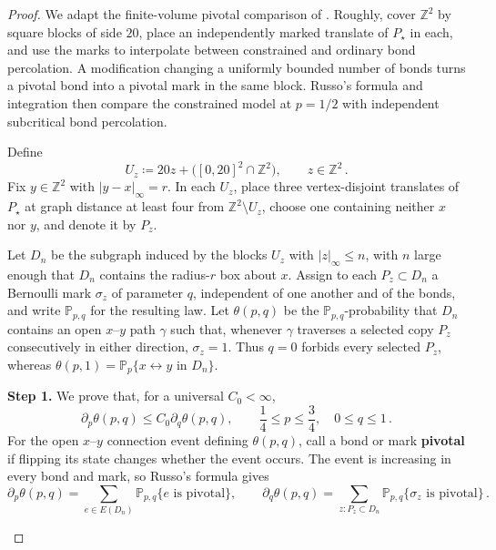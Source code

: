 \documentclass[11pt]{amsart}
\theoremstyle{plain}
\theoremstyle{definition}
\newcommand{\Z}{\mathbb Z}
\renewcommand{\P}{\mathbb P}
\newcommand{\defn}[1]{\textbf{#1}}
\begin{document}
	\begin{proof}
		We adapt the finite-volume pivotal comparison of
		\citet[Section~6, especially Theorem~6.1 and
		Proposition~6.3]{CoupierHenryJahnelKoppl2024}.  Roughly, cover $\Z^2$ by square
		blocks of side $20$, place an independently marked translate of $P_\star$ in
		each, and use the marks to interpolate between constrained and ordinary bond
		percolation.  A modification changing a uniformly bounded number of bonds turns
		a pivotal bond into a pivotal mark in the same block.  Russo's formula and
		integration then compare the constrained model at $p=1/2$ with independent subcritical
		bond percolation.

		Define
		\[
		U_z\coloneqq20z+\bigl([0,20]^2\cap\Z^2\bigr),
		\qquad z\in\Z^2\, .
		\]
		Fix $y\in\Z^2$ with $|y-x|_\infty=r$.  In
		each $U_z$, place three vertex-disjoint translates of $P_\star$ at graph distance at least four from
		$\Z^2\setminus U_z$, choose one containing neither $x$ nor $y$, and denote
		it by $P_z$.
		
		Let $D_n$ be the subgraph induced by the blocks $U_z$ with $|z|_\infty\leq n$,
		with $n$ large enough that $D_n$ contains the radius-$r$ box about $x$.  Assign to
		each $P_z\subset D_n$ a Bernoulli mark $\sigma_z$ of parameter $q$,
		independent of one another and of the bonds, and write $\P_{p,q}$ for the
		resulting law.  Let $\theta(p,q)$ be the $\P_{p,q}$-probability that $D_n$
		contains an open $x$--$y$ path $\gamma$ such that, whenever $\gamma$ traverses
		a selected copy $P_z$ consecutively in either direction, $\sigma_z=1$.  Thus
		$q=0$ forbids every selected $P_z$, whereas
		$\theta(p,1)=\P_p\{x\longleftrightarrow y\text{ in }D_n\}$.
		
		\noindent\textbf{Step 1.}  We prove that, for a universal $C_0<\infty$,
		\begin{equation}\label{eq:square-derivative-comparison}
			\partial_p\theta(p,q)
			\leq C_0\partial_q\theta(p,q),
			\qquad \frac14\leq p\leq\frac34,\quad 0\leq q\leq1\, .
		\end{equation}
		For the open $x$--$y$ connection event defining $\theta(p,q)$, call a bond or
		mark \defn{pivotal} if flipping its state changes whether the event occurs.  The
		event is increasing in every bond and mark, so Russo's formula gives
		\[
		\partial_p\theta(p,q)
		=\sum_{e\in E(D_n)}\P_{p,q}\{e\text{ is pivotal}\},
		\qquad
		\partial_q\theta(p,q)
		=\sum_{z:P_z\subset D_n}\P_{p,q}\{\sigma_z\text{ is pivotal}\}\, .
		\]
		
		\begin{figure}[t]
			\centering
			\begin{tikzpicture}[scale=0.55,
				lat/.style={draw=black!22,line width=0.6pt},
				shut/.style={draw=BrickRed!32,line width=0.6pt,
					dash pattern=on 1.2pt off 1.4pt},
				opath/.style={draw=RoyalBlue,line width=1.6pt},
				piv/.style={draw=RoyalBlue,line width=3.0pt},
				pat/.style={draw=BrickRed,line width=1.9pt},
				blk/.style={draw=black!55,line width=0.8pt,rounded corners=2pt},
				endv/.style={circle,draw=RoyalBlue,fill=white,line width=0.9pt,
					inner sep=1.5pt},
				mk/.style={circle,fill=black,inner sep=1.2pt}]


\end{tikzpicture}
\end{figure}
\end{proof}
\end{document}
